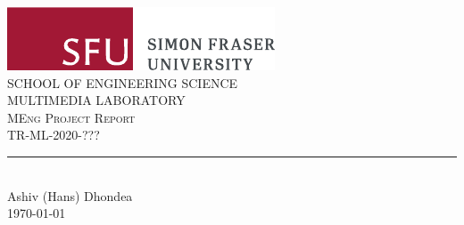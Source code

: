 %
%		
%
%
%
%
%





\begin{titlepage}
	\centering
	\includegraphics[scale = 0.75]{Figures/SFUhorizontallogorgb.pdf}\\[1.0 cm]
	\textsc{SCHOOL OF ENGINEERING SCIENCE}\\[0.2 cm]
	\textsc{MULTIMEDIA LABORATORY}\\[2.2 cm]
	\textsc{\Large MEng Project Report}\\[0.5 cm]
	\textsc{\normalsize TR-ML-2020-??? }\\[0.2 cm]
	\rule{\linewidth}{0.2 mm} \\[0.4 cm]
	
	
	\vspace*{2cm}
	Ashiv (Hans) Dhondea\linebreak
	\\
	\vspace{5cm}
	\today
	
	\vfill
	
\end{titlepage}